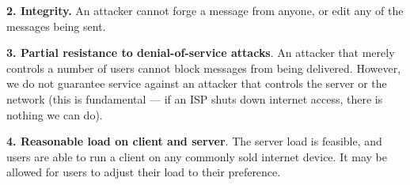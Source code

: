\textbf{2. Integrity.} An attacker cannot forge a message from anyone, or edit any of the messages being sent.

\textbf{3. Partial resistance to denial-of-service attacks}. An attacker that merely controls a number of users cannot block messages from being delivered. However, we do not guarantee service against an attacker that controls the server or the network (this is fundamental — if an ISP shuts down internet access, there is nothing we can do).

\textbf{4. Reasonable load on client and server}. The server load is feasible, and users are able to run a client on any commonly sold internet device. It may be allowed for users to adjust their load to their preference.

